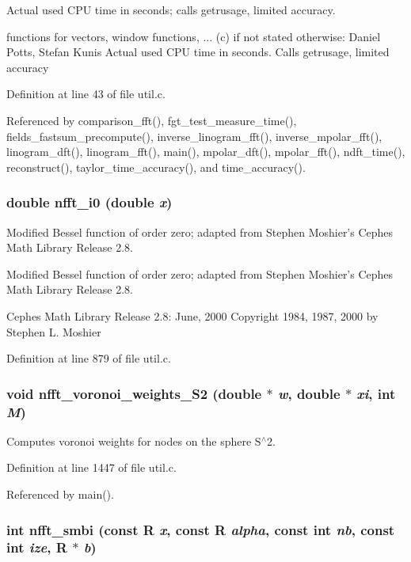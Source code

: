 Actual used CPU time in seconds; calls getrusage, limited accuracy.

functions for vectors, window functions, ... (c) if not stated otherwise: Daniel Potts, Stefan Kunis Actual used CPU time in seconds. Calls getrusage, limited accuracy 

Definition at line 43 of file util.c.

Referenced by comparison\_\-fft(), fgt\_\-test\_\-measure\_\-time(), fields\_\-fastsum\_\-precompute(), inverse\_\-linogram\_\-fft(), inverse\_\-mpolar\_\-fft(), linogram\_\-dft(), linogram\_\-fft(), main(), mpolar\_\-dft(), mpolar\_\-fft(), ndft\_\-time(), reconstruct(), taylor\_\-time\_\-accuracy(), and time\_\-accuracy().\hypertarget{group__nfftutil_g5d6e8d0901b95c0c48f719e517733e5b}{
\subsubsection{\setlength{\rightskip}{0pt plus 5cm}double nfft\_\-i0 (double {\em x})}}
\label{group__nfftutil_g5d6e8d0901b95c0c48f719e517733e5b}


Modified Bessel function of order zero; adapted from Stephen Moshier's Cephes Math Library Release 2.8. 

Modified Bessel function of order zero; adapted from Stephen Moshier's Cephes Math Library Release 2.8.

Cephes Math Library Release 2.8: June, 2000 Copyright 1984, 1987, 2000 by Stephen L. Moshier 

Definition at line 879 of file util.c.\hypertarget{group__nfftutil_g26a4ed487a23e99e01f111113be9f994}{
\subsubsection{\setlength{\rightskip}{0pt plus 5cm}void nfft\_\-voronoi\_\-weights\_\-S2 (double $\ast$ {\em w}, double $\ast$ {\em xi}, int {\em M})}}
\label{group__nfftutil_g26a4ed487a23e99e01f111113be9f994}


Computes voronoi weights for nodes on the sphere S$^\wedge$2. 



Definition at line 1447 of file util.c.

Referenced by main().\hypertarget{group__nfftutil_g2decee6fe50d50797a82737ba82cf97a}{
\subsubsection{\setlength{\rightskip}{0pt plus 5cm}int nfft\_\-smbi (const R {\em x}, const R {\em alpha}, const int {\em nb}, const int {\em ize}, R $\ast$ {\em b})}}
\label{group__nfftutil_g2decee6fe50d50797a82737ba82cf97a}


